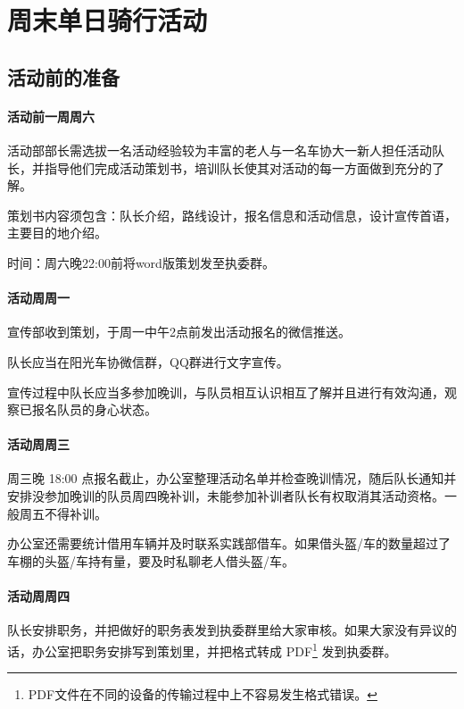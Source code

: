 \documentclass{ctexbook}
\begin{document}
\section{周末单日骑行活动}

\subsection{活动前的准备}

\paragraph{活动前一周周六}

活动部部长需选拔一名活动经验较为丰富的老人与一名车协大一新人担任活动队长，并指导他们完成活动策划书，培训队长使其对活动的每一方面做到充分的了解。

策划书内容须包含：队长介绍，路线设计，报名信息和活动信息，设计宣传首语，主要目的地介绍。

时间：周六晚22:00前将word版策划发至执委群。

\paragraph{活动周周一}

宣传部收到策划，于周一中午2点前发出活动报名的微信推送。

队长应当在阳光车协微信群，QQ群进行文字宣传。

宣传过程中队长应当多参加晚训，与队员相互认识相互了解并且进行有效沟通，观察已报名队员的身心状态。

\paragraph{活动周周三}

周三晚 18:00 点报名截止，办公室整理活动名单并检查晚训情况，随后队长通知并安排没参加晚训的队员周四晚补训，未能参加补训者队长有权取消其活动资格。一般周五不得补训。

办公室还需要统计借用车辆并及时联系实践部借车。如果借头盔/车的数量超过了车棚的头盔/车持有量，要及时私聊老人借头盔/车。

\paragraph{活动周周四}

队长安排职务，并把做好的职务表发到执委群里给大家审核。如果大家没有异议的话，办公室把职务安排写到策划里，并把格式转成 PDF\footnote{PDF文件在不同的设备的传输过程中上不容易发生格式错误。} 发到执委群。
\end{document}
